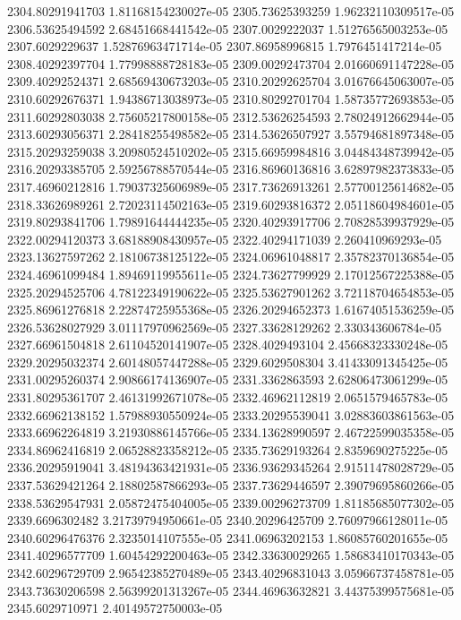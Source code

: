 {2304.80291941703 1.81168154230027e-05
2305.73625393259 1.96232110309517e-05
2306.53625494592 2.68451668441542e-05
2307.0029222037 1.51276565003253e-05
2307.6029229637 1.52876963471714e-05
2307.86958996815 1.7976451417214e-05
2308.40292397704 1.77998888728183e-05
2309.00292473704 2.01660691147228e-05
2309.40292524371 2.68569430673203e-05
2310.20292625704 3.01676645063007e-05
2310.60292676371 1.94386713038973e-05
2310.80292701704 1.58735772693853e-05
2311.60292803038 2.75605217800158e-05
2312.53626254593 2.78024912662944e-05
2313.60293056371 2.28418255498582e-05
2314.53626507927 3.55794681897348e-05
2315.20293259038 3.20980524510202e-05
2315.66959984816 3.04484348739942e-05
2316.20293385705 2.59256788570544e-05
2316.86960136816 3.62897982373833e-05
2317.46960212816 1.79037325606989e-05
2317.73626913261 2.57700125614682e-05
2318.33626989261 2.72023114502163e-05
2319.60293816372 2.05118604984601e-05
2319.80293841706 1.79891644444235e-05
2320.40293917706 2.70828539937929e-05
2322.00294120373 3.68188908430957e-05
2322.40294171039 2.260410969293e-05
2323.13627597262 2.18106738125122e-05
2324.06961048817 2.35782370136854e-05
2324.46961099484 1.89469119955611e-05
2324.73627799929 2.17012567225388e-05
2325.20294525706 4.78122349190622e-05
2325.53627901262 3.72118704654853e-05
2325.86961276818 2.22874725955368e-05
2326.20294652373 1.61674051536259e-05
2326.53628027929 3.01117970962569e-05
2327.33628129262 2.330343606784e-05
2327.66961504818 2.61104520141907e-05
2328.4029493104 2.45668323330248e-05
2329.20295032374 2.60148057447288e-05
2329.6029508304 3.41433091345425e-05
2331.00295260374 2.90866174136907e-05
2331.3362863593 2.62806473061299e-05
2331.80295361707 2.46131992671078e-05
2332.46962112819 2.0651579465783e-05
2332.66962138152 1.57988930550924e-05
2333.20295539041 3.02883603861563e-05
2333.66962264819 3.21930886145766e-05
2334.13628990597 2.46722599035358e-05
2334.86962416819 2.06528823358212e-05
2335.73629193264 2.8359690275225e-05
2336.20295919041 3.48194363421931e-05
2336.93629345264 2.91511478028729e-05
2337.53629421264 2.18802587866293e-05
2337.73629446597 2.39079695860266e-05
2338.53629547931 2.05872475404005e-05
2339.00296273709 1.81185685077302e-05
2339.6696302482 3.21739794950661e-05
2340.20296425709 2.76097966128011e-05
2340.60296476376 2.3235014107555e-05
2341.06963202153 1.86085760201655e-05
2341.40296577709 1.60454292200463e-05
2342.33630029265 1.58683410170343e-05
2342.60296729709 2.96542385270489e-05
2343.40296831043 3.05966737458781e-05
2343.73630206598 2.56399201313267e-05
2344.46963632821 3.44375399575681e-05
2345.6029710971 2.40149572750003e-05
}

